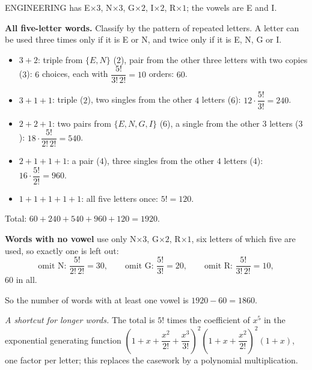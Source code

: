 ENGINEERING has E$\times3$, N$\times3$, G$\times2$, I$\times2$, R$\times1$; the vowels are E and I.

\textbf{All five-letter words.} Classify by the pattern of repeated letters. A letter can be used three times only if it is E or N, and twice only if it is E, N, G or I.
\begin{itemize}
\item $3+2$: triple from $\{E,N\}$ ($2$), pair from the other three letters with two copies ($3$): $6$ choices, each with $\dfrac{5!}{3!\,2!}=10$ orders: $60$.
\item $3+1+1$: triple ($2$), two singles from the other $4$ letters ($6$): $12\cdot\dfrac{5!}{3!}=240$.
\item $2+2+1$: two pairs from $\{E,N,G,I\}$ ($6$), a single from the other $3$ letters ($3$): $18\cdot\dfrac{5!}{2!\,2!}=540$.
\item $2+1+1+1$: a pair ($4$), three singles from the other $4$ letters ($4$): $16\cdot\dfrac{5!}{2!}=960$.
\item $1+1+1+1+1$: all five letters once: $5!=120$.
\end{itemize}
Total: $60+240+540+960+120=1920$.

\textbf{Words with no vowel} use only N$\times3$, G$\times2$, R$\times1$, six letters of which five are used, so exactly one is left out:
\[
\text{omit N: }\dfrac{5!}{2!\,2!}=30,\qquad\text{omit G: }\dfrac{5!}{3!}=20,\qquad\text{omit R: }\dfrac{5!}{3!\,2!}=10,
\]
$60$ in all.

So the number of words with at least one vowel is $1920-60=\boxed{1860}$.

\emph{A shortcut for longer words.} The total is $5!$ times the coefficient of $x^5$ in the exponential generating function $\left(1+x+\dfrac{x^2}{2!}+\dfrac{x^3}{3!}\right)^2\left(1+x+\dfrac{x^2}{2!}\right)^2(1+x)$, one factor per letter; this replaces the casework by a polynomial multiplication.
